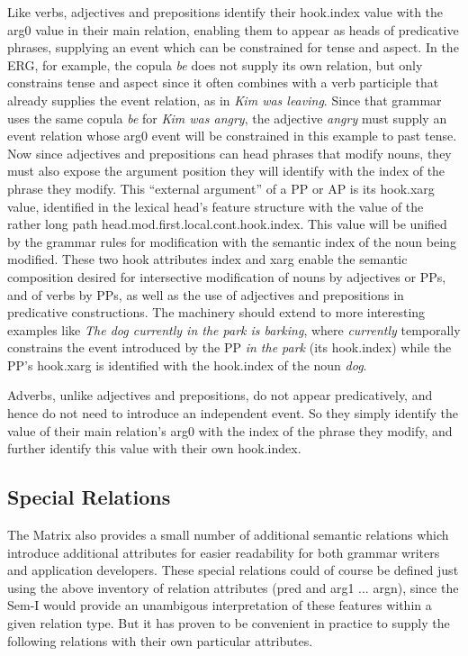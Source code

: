 \documentclass[12pt]{article}
\newcommand{\mpt}[1]{\marginpar{\tiny #1}}
\begin{document}
Like verbs, adjectives and prepositions identify their {\sc hook.index} value 
with the {\sc arg0} value in their main relation, enabling them to appear as
heads of predicative phrases, supplying an event which can be constrained for
tense and aspect.  In the ERG, for example, the copula {\it be} does not
supply its own relation, but only constrains tense and aspect since it often
combines with a verb participle that already supplies the event relation, as 
in {\it Kim was leaving}.  Since that
grammar uses the same copula {\it be} for {\it Kim was angry}, the adjective
{\it angry} must supply an event relation whose {\sc arg0} event will be
constrained in this example to past tense.  Now since adjectives and
prepositions can head phrases that modify nouns, they must also expose the
argument position they will identify with the index of the phrase they
modify.  This ``external argument'' of a PP or AP is its {\sc hook.xarg}
value, identified in the lexical head's feature structure with the value of
the rather long path {\sc head.mod.first.local.cont.hook.index}.  This value
will be unified by the grammar rules for modification with the semantic index 
of the noun being modified.   These two {\sc hook} attributes {\sc index} and
{\sc xarg} enable the semantic composition desired for intersective
modification of nouns by adjectives or PPs, and of verbs by PPs, as well as
the use of adjectives and prepositions in predicative constructions.  The
machinery should extend to more interesting examples like {\it The dog 
currently in the park is barking}, where {\it currently} temporally constrains
the event introduced by the PP {\it in the park} (its {\sc hook.index}) while 
the PP's {\sc hook.xarg} is identified with the {\sc hook.index} of the noun
{\it dog}.

Adverbs,\mpt{out of date} unlike adjectives and prepositions, do not appear predicatively, and
hence do not need to introduce an independent event.  So they simply identify
the value of their main relation's {\sc arg0} with the index of the phrase
they modify, and further identify this value with their own {\sc hook.index}.

\subsection{Special Relations}

The Matrix also provides a small number of additional semantic relations which
introduce additional attributes for easier readability for both grammar
writers and application developers.  These special relations could of course
be defined just using the above inventory of relation attributes ({\sc pred}
and {\sc arg1 ... argn}), since the Sem-I would provide an unambigous
interpretation of these features within a given relation type.  But it has
proven to be convenient in practice to supply the following relations with
their own particular attributes.
\end{document}
